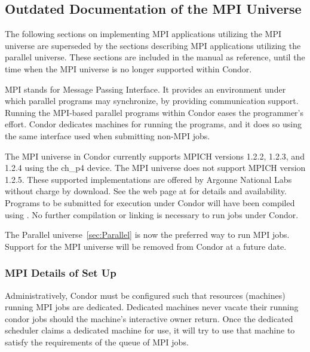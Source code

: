 \subsection{\label{sec:MPI}Outdated Documentation of the MPI Universe}

The following sections on implementing MPI applications utilizing
the MPI universe are superseded by the sections describing
MPI applications utilizing the parallel universe.
These sections are included in the manual as reference,
until the time when the MPI universe is no longer supported within Condor.

MPI stands for Message Passing Interface.
It provides an environment under which parallel programs
may synchronize, 
by providing communication support.
Running the MPI-based parallel programs within Condor 
eases the programmer's effort.
Condor dedicates machines for running the programs,
and it does so using the same interface used when submitting
non-MPI jobs.

The MPI universe in Condor currently supports MPICH versions 1.2.2, 1.2.3, 
and 1.2.4 using the ch\_p4 device. 
The MPI universe does not support MPICH version 1.2.5.
These supported implementations are
offered by Argonne National Labs
without charge by download.
See the web page at
for details and availability.
Programs to be submitted for execution under Condor will have
been compiled using .
No further compilation or linking is necessary to run jobs
under Condor.

The Parallel universe~\ref{sec:Parallel} is now the preferred
way to run MPI jobs. 
Support for the MPI universe will be removed from Condor at a future date.
\subsubsection{\label{sec:MPI-setup}MPI Details of Set Up}

Administratively, Condor must be configured such that resources
(machines) running MPI jobs are dedicated.
Dedicated machines never vacate their running condor jobs
should the machine's interactive owner return.  Once the dedicated 
scheduler claims a dedicated machine for use, it will try to use
that machine to satisfy the requirements of the queue of MPI jobs.


